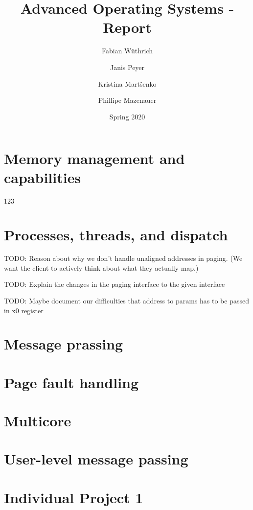 \documentclass[11pt,a4paper]{report}
\begin{document}
\title{Advanced Operating Systems - Report}
\author{
Fabian Wüthrich
\and
Janis Peyer 
\and
Kristina Martšenko
\and
Phillipe Mazenauer
}
\date{Spring 2020}

\maketitle

\tableofcontents

\listoffigures

\listoftables

\clearpage

\chapter{Memory management and capabilities}

123 \cite{aos-book}

\chapter{Processes, threads, and dispatch}

TODO: Reason about why we don't handle unaligned addresses in paging. (We want the client to actively think about what they actually map.)

TODO: Explain the changes in the paging interface to the given interface

TODO: Maybe document our difficulties that address to params has to be passed in x0 register

\chapter{Message prassing}

\chapter{Page fault handling}

\chapter{Multicore}

\chapter{User-level message passing}

\chapter{Individual Project 1}
\end{document}
